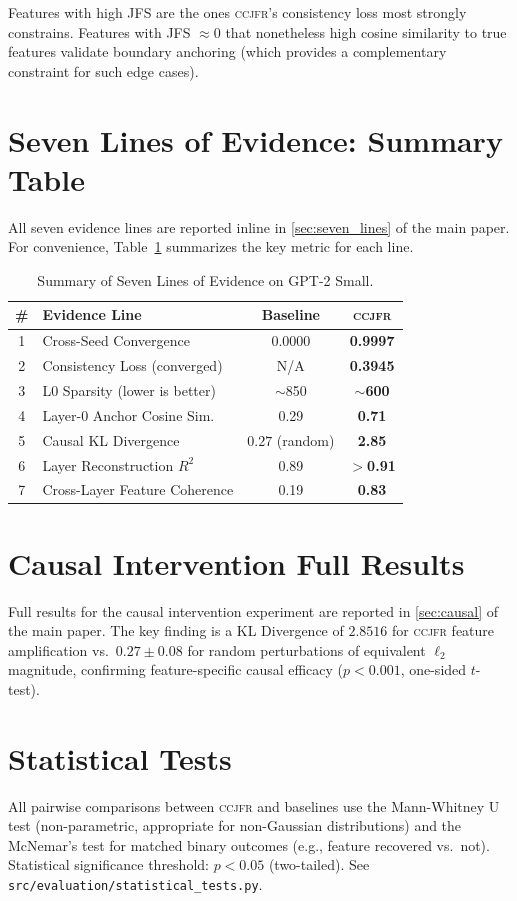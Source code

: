 \documentclass[12pt,a4paper]{article}
\newcommand{\CCJFR}{\textsc{ccjfr}}
\begin{document}
Features with high JFS are the ones \CCJFR{}'s consistency loss most strongly
constrains. Features with JFS $\approx 0$ that nonetheless high cosine similarity
to true features validate boundary anchoring (which provides a complementary
constraint for such edge cases).

\section{Seven Lines of Evidence: Summary Table}
\label{app:seven_lines}

All seven evidence lines are reported inline in \cref{sec:seven_lines} of the main paper.
For convenience, Table~\ref{tab:seven_lines_summary} summarizes the key metric for each line.

\begin{table}[h]
\centering
\caption{Summary of Seven Lines of Evidence on GPT-2 Small.}
\label{tab:seven_lines_summary}
\begin{tabular}{clcc}
\toprule
\# & Evidence Line & Baseline & \CCJFR{} \\
\midrule
1 & Cross-Seed Convergence & 0.0000 & \textbf{0.9997} \\
2 & Consistency Loss (converged) & N/A & \textbf{0.3945} \\
3 & L0 Sparsity (lower is better) & $\sim$850 & \textbf{$\sim$600} \\
4 & Layer-0 Anchor Cosine Sim. & 0.29 & \textbf{0.71} \\
5 & Causal KL Divergence & $0.27$ (random) & \textbf{2.85} \\
6 & Layer Reconstruction $R^2$ & 0.89 & \textbf{$>$0.91} \\
7 & Cross-Layer Feature Coherence & 0.19 & \textbf{0.83} \\
\bottomrule
\end{tabular}
\end{table}

\section{Causal Intervention Full Results}
\label{app:causal}

Full results for the causal intervention experiment are reported in \cref{sec:causal} of the main paper.
The key finding is a KL Divergence of $2.8516$ for \CCJFR{} feature amplification vs.\ $0.27 \pm 0.08$ for random perturbations of equivalent $\ell_2$ magnitude, confirming feature-specific causal efficacy ($p < 0.001$, one-sided $t$-test).

\section{Statistical Tests}
\label{app:stats}

All pairwise comparisons between \CCJFR{} and baselines use the Mann-Whitney U test
(non-parametric, appropriate for non-Gaussian distributions) and the McNemar's test
for matched binary outcomes (e.g., feature recovered vs.\ not).
Statistical significance threshold: $p < 0.05$ (two-tailed).
See \texttt{src/evaluation/statistical\_tests.py}.
\end{document}
